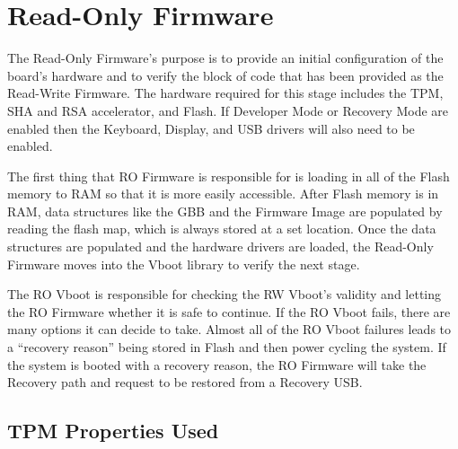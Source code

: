 \documentclass[../report.tex]{subfiles}
\begin{document}
\onehalfspacing


\section{Read-Only Firmware}

The Read-Only Firmware's purpose is to provide an initial configuration of the board's hardware and to verify the block of code that has been provided as the Read-Write Firmware.
The hardware required for this stage includes the TPM, SHA and RSA accelerator, and Flash.
If Developer Mode or Recovery Mode are enabled then the Keyboard, Display, and USB drivers will also need to be enabled.

The first thing that RO Firmware is responsible for is loading in all of the Flash memory to RAM so that it is more easily accessible. 
After Flash memory is in RAM, data structures like the GBB and the Firmware Image are populated by reading the flash map, which is always stored at a set location.
Once the data structures are populated and the hardware drivers are loaded, the Read-Only Firmware moves into the Vboot library to verify the next stage.

The RO Vboot is responsible for checking the RW Vboot's validity and letting the RO Firmware whether it is safe to continue.
If the RO Vboot fails, there are many options it can decide to take.
Almost all of the RO Vboot failures leads to a ``recovery reason'' being stored in Flash and then power cycling the system.
If the system is booted with a recovery reason, the RO Firmware will take the Recovery path and request to be restored from a Recovery USB\@. %

\subsection{TPM Properties Used}
\end{document}
